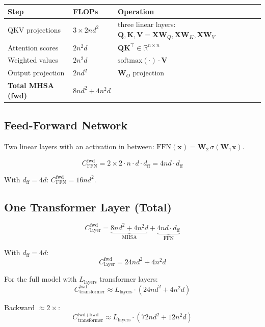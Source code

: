 \documentclass[11pt]{article}
\begin{document}
\begin{center}
\renewcommand{\arraystretch}{1.3}
\begin{tabular}{lll}
\toprule
\textbf{Step} & \textbf{FLOPs} & \textbf{Operation} \\
\midrule
QKV projections & $3 \times 2nd^2$ & three linear layers: $\mathbf{Q}, \mathbf{K}, \mathbf{V} = \mathbf{X}\mathbf{W}_Q, \mathbf{X}\mathbf{W}_K, \mathbf{X}\mathbf{W}_V$ \\
Attention scores & $2n^2 d$ & $\mathbf{Q}\mathbf{K}^\top \in \mathbb{R}^{n \times n}$ \\
Weighted values & $2n^2 d$ & $\text{softmax}(\cdot) \cdot \mathbf{V}$ \\
Output projection & $2nd^2$ & $\mathbf{W}_O$ projection \\
\midrule
\textbf{Total MHSA (fwd)} & $8nd^2 + 4n^2 d$ & \\
\bottomrule
\end{tabular}
\end{center}

\subsection{Feed-Forward Network}

Two linear layers with an activation in between: $\text{FFN}(\mathbf{x}) = \mathbf{W}_2 \,\sigma(\mathbf{W}_1 \mathbf{x})$.

\[
C_{\text{FFN}}^{\text{fwd}} = 2 \times 2 \cdot n \cdot d \cdot d_{\text{ff}} = 4nd \cdot d_{\text{ff}}
\]

With $d_{\text{ff}} = 4d$: $C_{\text{FFN}}^{\text{fwd}} = 16nd^2$.

\subsection{One Transformer Layer (Total)}

\[
C_{\text{layer}}^{\text{fwd}} = \underbrace{8nd^2 + 4n^2 d}_{\text{MHSA}} + \underbrace{4nd \cdot d_{\text{ff}}}_{\text{FFN}}
\]

With $d_{\text{ff}} = 4d$:
\[
C_{\text{layer}}^{\text{fwd}} = 24nd^2 + 4n^2 d
\]

For the full model with $L_{\text{layers}}$ transformer layers:
\[
\boxed{C_{\text{transformer}}^{\text{fwd}} \approx L_{\text{layers}} \cdot (24nd^2 + 4n^2 d)}
\]

Backward $\approx 2\times$:
\[
C_{\text{transformer}}^{\text{fwd+bwd}} \approx L_{\text{layers}} \cdot (72nd^2 + 12n^2 d)
\]
\end{document}
